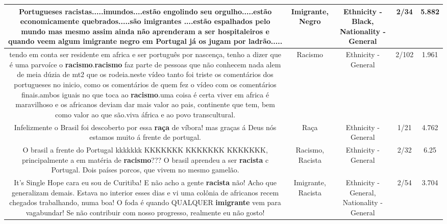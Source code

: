 \documentclass[11pt]{article}
\newlength\mylength
\begin{document}
\begin{center}
\begin{longtable}{|C{.65\mylength}|C{.30\mylength}|C{.12\mylength}|C{.12\mylength}|C{.12\mylength}|}
  \small Portugueses racistas.....imundos....estão engolindo seu orgulho.....estão economicamente quebrados.....são imigrantes ....estão espalhados pelo mundo mas mesmo assim ainda não aprenderam a ser hospitaleiros e quando veem algum \textbf{imigrante} \textbf{negro} em Portugal já os jugam por ladrão.....\normalsize   & Imigrante, Negro & Ethnicity - Black, Nationality - General & 2/34 & 5.882 \\  \hline
  \small tendo em conta ser residente em africa e ser português por nascença, tenho a dizer que é uma parvoíce o \textbf{racismo}.\textbf{racismo} faz parte de pessoas que não conhecem nada alem de meia dúzia de mt2 que os rodeia.neste vídeo tanto foi triste os comentários dos portugueses no inicio, como os comentários de quem fez o vídeo com os comentários finais.ambos iguais no que toca ao \textbf{racismo}.uma coisa é certa viver em africa é maravilhoso e os africanos deviam dar mais valor ao pais, continente que tem, bem como valor ao que são.viva áfrica e ao povo transcultural.\normalsize   & Racismo & Ethnicity - General & 2/102 & 1.961 \\  \hline
  \small Infelizmente o Brasil foi descoberto por essa \textbf{raça} de víbora! mas graças á Deus nós estamos muito á frente de portugal.\normalsize   & Raça & Ethnicity - General & 1/21 & 4.762 \\  \hline
  \small O brasil a frente do Portugal kkkkkkk KKKKKKK KKKKKKK KKKKKKK, principalmente a em matéria de \textbf{racismo}??? O brasil aprendeu a ser \textbf{racista} c Portugal. Dois países porcos, que vivem no mesmo gamelão.\normalsize   & Racismo, Racista & Ethnicity - General & 2/32 & 6.25 \\  \hline
  \small It's Single Hope cara eu sou de Curitiba! E não acho a gente \textbf{racista} não! Acho que generalizam demais. Estava no interior esses dias e vi uma colônia de africanos recem chegados trabalhando, numa boa! O foda é quando QUALQUER \textbf{imigrante} vem para vagabundar! Se não contribuir com nosso progresso, realmente eu não gosto!\normalsize   & Imigrante, Racista & Ethnicity - General, Nationality - General & 2/54 & 3.704 \\  \hline

\end{longtable}
\end{center}
\end{document}
